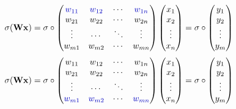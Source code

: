 \begin{minipage}{.8\textwidth}
    \begin{equation}
        \sigma(\mathbf{Wx}) = \sigma \circ 
        \begin{pmatrix} 
            \color{blue} w_{11}  &  \color{blue}w_{12}  & \cdots & \color{blue}w_{1n} \\
             w_{21} 				 & w_{22} 				& \cdots & w_{2n}			   \\
            \vdots 				 & \cdots 				& \ddots & \vdots 			   \\
             w_{m1}             & w_{m2}	            &\cdots  & w_{mn}  
        \end{pmatrix} 
        \begin{pmatrix}
            x_1\\
            x_2\\
            \vdots\\
            x_n
        \end{pmatrix}
        = \sigma \circ 
        \begin{pmatrix}
            y_1\\
            y_2\\
            \vdots\\
            y_m
        \end{pmatrix}
    \end{equation}
    \vspace{4em}
    \begin{equation}
        \sigma(\mathbf{Wx}) = \sigma \circ 
        \begin{pmatrix} 
            w_{11}  &              w_{12}              & \cdots & w_{1n} \\
             w_{21} 				 & w_{22} 				& \cdots & w_{2n}			   \\
            \vdots 				 & \cdots 				& \ddots & \vdots 			   \\
            \color{blue} w_{m1}  & \color{blue}w_{m2}	&\cdots  & \color{blue}w_{mn}  
        \end{pmatrix} 
        \begin{pmatrix}
            x_1\\
            x_2\\
            \vdots\\
            x_n
        \end{pmatrix}
        = \sigma \circ 
        \begin{pmatrix}
            y_1\\
            y_2\\
            \vdots\\
            y_m
        \end{pmatrix}
    \end{equation}
    \vspace{2em}
\end{minipage}

